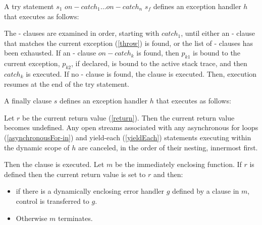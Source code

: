 \documentclass{article}
\begin{document}
\begin{itemize}




\LMHash{}
A try statement \TRY{} $s_1$ $on-catch_1 \ldots  on-catch_n$ \FINALLY{} $s_f$  defines an exception handler $h$ that executes as follows:

\LMHash{}
The \ON{}-\CATCH{} clauses are examined in order, starting with $catch_1$, until either an \ON{}-\CATCH{} clause that matches the current exception (\ref{throw}) is found, or the list of \ON{}-\CATCH{} clauses has been exhausted. If an \ON{}-\CATCH{} clause $on-catch_k$ is found, then $p_{k1}$ is bound to the current exception,  $p_{k2}$, if declared,  is bound to the active stack trace, and then $catch_k$ is executed. If no \ON{}-\CATCH{} clause is found, the \FINALLY{} clause is executed. Then, execution resumes at the end of the try statement.


\LMHash{}
A finally clause \FINALLY{} $s$ defines an exception handler $h$ that executes as follows:

\LMHash{}
Let $r$ be the current return value (\ref{return}). Then the current return value becomes undefined. Any open streams associated with any asynchronous for loops (\ref{asynchronousFor-in}) and yield-each (\ref{yieldEach}) statements executing within the dynamic scope of $h$ are canceled, in the order of their nesting, innermost first.


\LMHash{}
Then the \FINALLY{} clause is executed. Let $m$ be the immediately enclosing function. If $r$ is defined then the current return value is set to $r$ and then:
\begin{itemize}
\item
 if there is a dynamically enclosing error handler $g$ defined by a \FINALLY{} clause in $m$, control is transferred to $g$.
 \item
Otherwise $m$ terminates.
\end{itemize}


\end{itemize}
\end{document}
